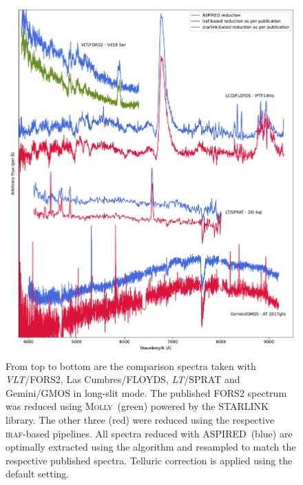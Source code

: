 \documentclass[linenumbers, twocolumn]{aastex631}
\begin{document}
\begin{figure}
    \centering
    \includegraphics[width=\textwidth]{fig_08_reduction_compared.pdf}
    \caption{From top to bottom are the comparison spectra taken with \textit{VLT}/FORS2,
    Las Cumbres/FLOYDS, \textit{LT}/SPRAT and Gemini/GMOS in long-slit mode. The published FORS2
    spectrum was reduced using \textsc{Molly}~(green) powered by the \textsc{STARLINK}
    library. The other three (red) were reduced using the respective \textsc{iraf}-based
    pipelines. All spectra reduced with \textsc{ASPIRED}~(blue) are optimally extracted using the \cite{1986PASP...98..609H} algorithm and resampled to match
    the respective published spectra. Telluric correction is applied using the default
    setting.}
    \label{fig:reduction_compared}
\end{figure}
\end{document}
